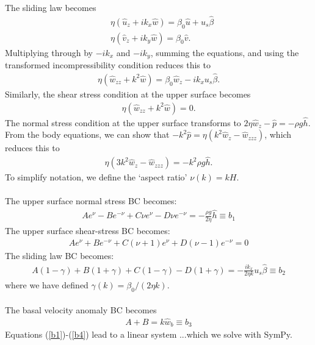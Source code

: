 \documentclass[paper=a4, fontsize=11pt]{article}
\begin{document}
The sliding law becomes
\begin{align}
&\eta( \widehat{u}_z + ik_x \widehat{w}) = \beta_0\widehat{u} + u_s\widehat{\beta} \\
&\eta( \widehat{v}_z + ik_y \widehat{w}) = \beta_0\widehat{v}.
\end{align}
Multiplying through by $-ik_x$ and $-ik_y$, summing the equations, and using the transformed incompressibility
condition reduces this to
\begin{align}
\eta(\widehat{w}_{zz} + k^2 \widehat{w}) = \beta_0 \widehat{w}_z - ik_x   u_s\widehat{\beta}.
\end{align}
Similarly, the shear stress condition at the upper surface becomes
\begin{align}
\eta(\widehat{w}_{zz} + k^2 \widehat{w}) =  0.
\end{align}
The normal stress condition at the upper surface transforms to
$
2\eta \widehat{w}_{z} - \widehat{p} = -\rho g \widehat{h}.
$
From the body equations, we can show that
$-k^2 \widehat{p} = \eta(k^2\widehat{w}_z - \widehat{w}_{zzz}) $, which reduces this to
\begin{align}
\eta (3k^2 \widehat{w}_{z}-\widehat{w}_{zzz})  = -k^2 \rho g \widehat{h}.
\end{align}
To simplify notation, we define the `aspect ratio' $\nu(k) = kH$.\\ \\
The upper surface normal stress BC becomes:
\begin{align}
{A} e^{\nu} - {B} e^{-\nu} + {C}\nu e^{\nu} - {D}\nu e^{-\nu}
=- \frac{\rho g }{2\eta }\widehat{h} \equiv b_1 \label{b1}
\end{align}
The upper surface shear-stress BC becomes:
\begin{align}
A e^{\nu} + B e^{-\nu} + C(\nu+1) e^{\nu} +D(\nu-1) e^{-\nu} =  0
\end{align}
The sliding law BC becomes:
\begin{align}
{A(1-\gamma)} + {B(1+\gamma)} + {C(1-\gamma)}  - {D(1+\gamma)} = -\frac{ ik_x }{2\eta k}u_s\widehat{\beta}\equiv b_2
\end{align}
where we have defined $\gamma(k) = \beta_0/(2\eta k)$. \\
\\ The basal velocity anomaly BC becomes
\begin{align}
{A} + {B}  = k\widehat{w}_b \equiv b_3 \label{b4}
\end{align}
Equations (\ref{b1})-(\ref{b4}) lead to a linear system
...which we solve with SymPy.\\ \\
\end{document}
